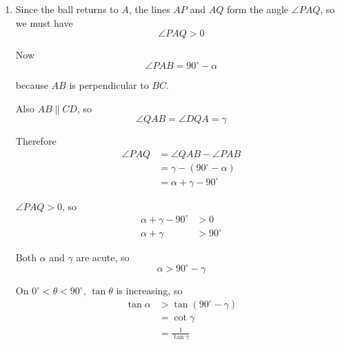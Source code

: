 \documentclass[leqno]{article}
\begin{document}
\begin{enumerate}[
  label=\textbf{\arabic*.},
  leftmargin=*,
  topsep=0pt,
  partopsep=0pt,
  parsep=0pt
]
\begin{djsSolution}
\begin{enumerate}[label=\textbf{(\alph*)}]
  After impact, along $QA$ with speed $W$:
  \[
  \text{parallel to }CD = W\cos\gamma, 
  \qquad
  \text{perpendicular to }CD = W\sin\gamma
  \]

  Therefore
  \begin{align*}
  W\cos\gamma &= V\sin\beta \\
  W\sin\gamma &= e_2V\cos\beta
  \end{align*}

  Dividing:
  \begin{align*}
  \tan\gamma
  &= \frac{e_2V\cos\beta}{V\sin\beta} \\
  &= \frac{e_2}{\tan\beta}
  \end{align*}

  So
  \[
  e_2 = \tan\beta\tan\gamma
  \]

  Using part (a), $\tan\beta = e_1\tan\alpha$, hence
  \begin{align*}
  e_2 &= (e_1\tan\alpha)\tan\gamma \\
      &= e_1\tan\alpha\tan\gamma
  \end{align*}

  Hence
  \[
  e_1\tan\alpha\tan\gamma = e_2
  \]

  \item Since the ball returns to $A$, the lines $AP$ and $AQ$ form the angle $\angle PAQ$, so we must have
  \[
  \angle PAQ > 0
  \]

  Now
  \[
  \angle PAB = 90^\circ-\alpha
  \]

  because $AB$ is perpendicular to $BC$.

  Also $AB \parallel CD$, so
  \[
  \angle QAB = \angle DQA = \gamma
  \]

  Therefore
  \begin{align*}
  \angle PAQ
  &= \angle QAB - \angle PAB \\
  &= \gamma - (90^\circ-\alpha) \\
  &= \alpha+\gamma-90^\circ
  \end{align*}

  $\angle PAQ>0$, so
  \begin{align*}
  \alpha+\gamma-90^\circ &> 0 \\
  \alpha+\gamma &> 90^\circ
  \end{align*}

  Both $\alpha$ and $\gamma$ are acute, so
  \[
  \alpha > 90^\circ-\gamma
  \]

  On $0^\circ<\theta<90^\circ$, $\tan\theta$ is increasing, so
  \begin{align*}
  \tan\alpha &> \tan(90^\circ-\gamma) \\
             &= \cot\gamma \\
             &= \frac{1}{\tan\gamma}
  \end{align*}


\end{enumerate}
\end{djsSolution}
\end{enumerate}
\end{document}
